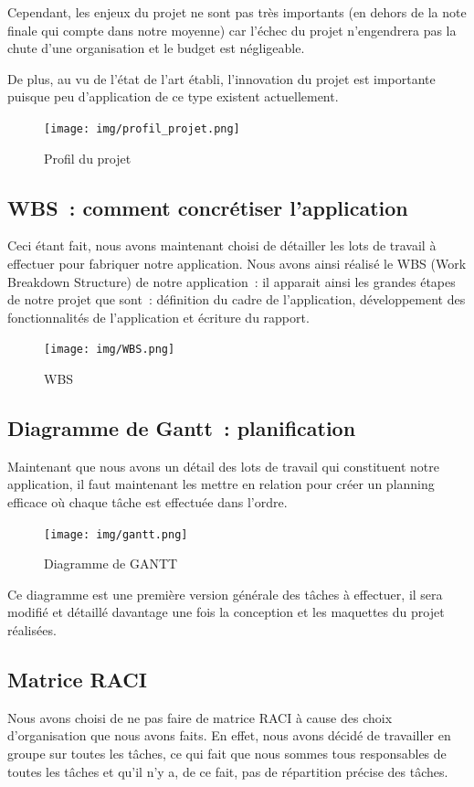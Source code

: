 \documentclass[french,a4paper]{article}
\begin{document}
    Cependant, les enjeux du projet ne sont pas très importants (en dehors de la note finale qui compte dans notre moyenne) car l'échec du projet n'engendrera pas la chute d'une organisation et le budget est négligeable.

    De plus, au vu de l’état de l’art établi, l’innovation du projet est importante puisque peu d'application de ce type existent actuellement.

    \begin{figure}[H]
        \centering
        \texttt{[image: img/profil\_projet.png]}
        \caption{Profil du projet}
    \end{figure}

    \subsection{WBS~: comment concrétiser l’application}
    Ceci étant fait, nous avons maintenant choisi de détailler les lots de travail à effectuer pour fabriquer notre application. Nous avons ainsi réalisé le WBS (Work Breakdown Structure) de notre application~: il apparait ainsi les grandes étapes de notre projet que sont~: définition du cadre de l’application, développement des fonctionnalités de l’application et écriture du rapport.
    \begin{figure}[H]
        \centering
        \texttt{[image: img/WBS.png]}
        \caption{WBS}
    \end{figure}

    \subsection{Diagramme de Gantt~: planification}
    Maintenant que nous avons un détail des lots de travail qui constituent notre application, il faut maintenant les mettre en relation pour créer un planning efficace où chaque tâche est effectuée dans l’ordre.
    \begin{figure}[H]
        \centering
        \texttt{[image: img/gantt.png]}
        \caption{Diagramme de GANTT}
    \end{figure}
    Ce diagramme est une première version générale des tâches à effectuer, il sera modifié et détaillé davantage une fois la conception et les maquettes du projet réalisées.

    \subsection{Matrice RACI}
    Nous avons choisi de ne pas faire de matrice RACI à cause des choix d'organisation que nous avons faits. En effet,
    nous avons décidé de travailler en groupe sur toutes les tâches, ce qui fait que nous sommes tous responsables de toutes les tâches et qu'il n'y a, de ce fait,
    pas de répartition précise des tâches.
\end{document}
